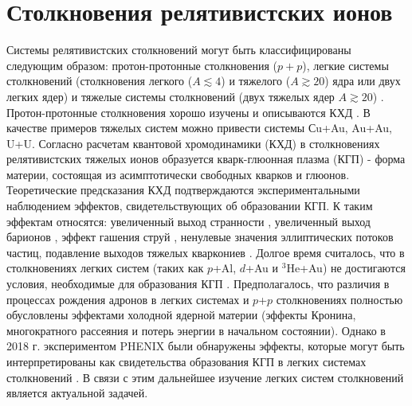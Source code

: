 
\chapter{Столкновения релятивистских ионов} \label{ch:ch1}
Системы релятивистских столкновений могут быть классифицированы следующим образом: протон-протонные столкновения ($p+p$), легкие системы столкновений (столкновения легкого ($A \lesssim 4$) и тяжелого ($A \gtrsim 20$) ядра или двух легких ядер) и тяжелые системы столкновений (двух тяжелых ядер $A \gtrsim 20$) \cite{QGP, Shmatov}. Протон-протонные столкновения хорошо изучены и описываются КХД \cite{CH_pp,PHENIX_Nature}. В качестве примеров тяжелых систем можно привести системы Сu+Au, Au+Au, U+U. Согласно расчетам квантовой хромодинамики (КХД) в столкновениях релятивистских тяжелых ионов образуется кварк-глюонная плазма (КГП) - форма материи, состоящая из асимптотически свободных кварков и глюонов. Теоретические предсказания КХД подтверждаются экспериментальными наблюдением эффектов, свидетельствующих об образовании КГП. К таким эффектам относятся: увеличенный выход странности \cite{StrangEnh, Strangeness_QGP}, увеличенный выход барионов \cite{BaryonPuzzleHeavy,p2piRatio_2003,p2piRatio_130GeV}, эффект гашения струй \cite{JetQuenching1, JetQuenching2, JetQuenching3}, ненулевые значения эллиптических потоков частиц, подавление выходов тяжелых кваркониев \cite{quarkonia_melting, quarkonium_suppression}. Долгое время считалось, что в столкновениях легких систем (таких как $p$+Al, $d$+Au и $^3$He+Au) не достигаются условия, необходимые для образования КГП \cite{CNM, PHENIX_Nature}. Предполагалось, что различия в процессах рождения адронов в легких системах и $p$+$p$ столкновениях полностью обусловлены эффектами холодной ядерной материи \cite{CNM} (эффекты Кронина, многократного рассеяния и потерь энергии в начальном состоянии). Однако в 2018 г. экспериментом PHENIX были обнаружены эффекты, которые могут быть интерпретированы как свидетельства образования КГП в легких системах столкновений \cite{PHENIX_Nature}. В связи с этим дальнейшее изучение легких систем столкновений является актуальной задачей. 

